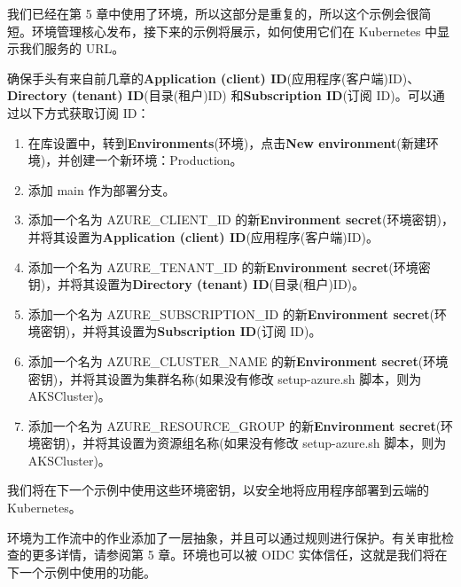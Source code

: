 我们已经在第 5 章中使用了环境，所以这部分是重复的，所以这个示例会很简短。环境管理核心发布，接下来的示例将展示，如何使用它们在 Kubernetes 中显示我们服务的 URL。


确保手头有来自前几章的\textbf{Application (client) ID}(应用程序(客户端)ID)、\textbf{Directory (tenant) ID}(目录(租户)ID) 和\textbf{Subscription ID}(订阅 ID)。可以通过以下方式获取订阅 ID：



\begin{enumerate}
\item 
在库设置中，转到\textbf{Environments}(环境)，点击\textbf{New environment}(新建环境)，并创建一个新环境：Production。

\item 
添加 main 作为部署分支。

\item 
添加一个名为 AZURE\_CLIENT\_ID 的新\textbf{Environment secret}(环境密钥)，并将其设置为\textbf{Application (client) ID}(应用程序(客户端)ID)。

\item 
添加一个名为 AZURE\_TENANT\_ID 的新\textbf{Environment secret}(环境密钥)，并将其设置为\textbf{Directory (tenant) ID}(目录(租户)ID)。

\item 
添加一个名为 AZURE\_SUBSCRIPTION\_ID 的新\textbf{Environment secret}(环境密钥)，并将其设置为\textbf{Subscription ID}(订阅 ID)。

\item 
添加一个名为 AZURE\_CLUSTER\_NAME 的新\textbf{Environment secret}(环境密钥)，并将其设置为集群名称(如果没有修改 setup-azure.sh 脚本，则为 AKSCluster)。

\item 
添加一个名为 AZURE\_RESOURCE\_GROUP 的新\textbf{Environment secret}(环境密钥)，并将其设置为资源组名称(如果没有修改 setup-azure.sh 脚本，则为 AKSCluster)。
\end{enumerate}

我们将在下一个示例中使用这些环境密钥，以安全地将应用程序部署到云端的 Kubernetes。


环境为工作流中的作业添加了一层抽象，并且可以通过规则进行保护。有关审批检查的更多详情，请参阅第 5 章。环境也可以被 OIDC 实体信任，这就是我们将在下一个示例中使用的功能。